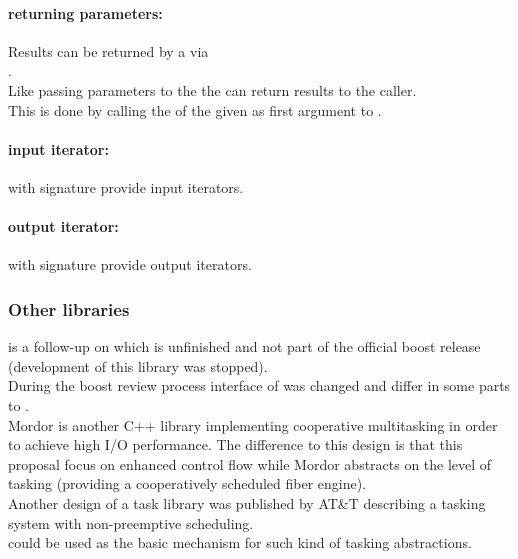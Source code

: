 \paragraph*{returning parameters:}
Results can be returned by a \corofunction via\\\coroop.\\
\newline
Like passing parameters to the \corofunction the \corofunction can return
results to the caller.\\ This is done by calling the \coroop of the \coro given
as first argument to \corofunction.

\paragraph*{input iterator:}
\coro with signature  provide input iterators.

\paragraph*{output iterator:}
\coro with signature  provide output iterators.


\subsubsection*{Other libraries}
\boostcoroutine is a follow-up on \boostcorosum which is unfinished and
not part of the official boost release (development of this library was
stopped).\\
During the boost review process interface of \boostcoroutine was changed and
differ in some parts to \boostcorosum.\\
Mordor\cite{mordor} is another C++ library implementing cooperative multitasking
in order to achieve high I/O performance. The difference to this design is that
this proposal focus on enhanced control flow while Mordor\cite{mordor} abstracts
on the level of tasking (providing a cooperatively scheduled fiber engine).\\
Another design of a task library was published by AT\&T\cite{atnt1989} describing
a tasking system with non-preemptive scheduling.\\
\coro could be used as the basic mechanism for such kind of tasking abstractions.\\

